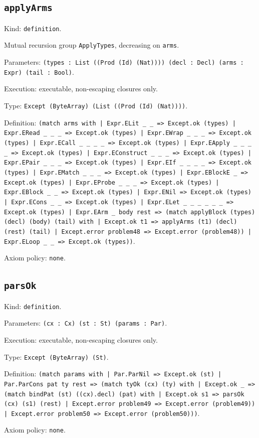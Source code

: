 \documentclass[11pt]{article}
\begin{document}
\subsection*{\texttt{applyArms}}
\noindent Kind: \texttt{definition}.\par
\noindent Mutual recursion group \texttt{ApplyTypes}, decreasing on \texttt{arms}.\par
\noindent Parameters: \texttt{(types : List ((Prod (Id) (Nat)))) (decl : Decl) (arms : Expr) (tail : Bool)}.\par
\noindent Execution: executable, non-escaping closures only.\par
\noindent Type: \texttt{Except (ByteArray) (List ((Prod (Id) (Nat))))}.\par
\noindent Definition: \texttt{(match arms with | Expr.ELit \_ \_ => Except.ok (types) | Expr.ERead \_ \_ \_ => Except.ok (types) | Expr.EWrap \_ \_ \_ => Except.ok (types) | Expr.ECall \_ \_ \_ \_ => Except.ok (types) | Expr.EApply \_ \_ \_ \_ => Except.ok (types) | Expr.EConstruct \_ \_ \_ => Except.ok (types) | Expr.EPair \_ \_ \_ => Except.ok (types) | Expr.EIf \_ \_ \_ \_ => Except.ok (types) | Expr.EMatch \_ \_ \_ => Except.ok (types) | Expr.EBlockE \_ => Except.ok (types) | Expr.EProbe \_ \_ \_ => Except.ok (types) | Expr.EBlock \_ \_ => Except.ok (types) | Expr.ENil => Except.ok (types) | Expr.ECons \_ \_ => Except.ok (types) | Expr.ELet \_ \_ \_ \_ \_ \_ => Except.ok (types) | Expr.EArm \_ body rest => (match applyBlock (types) (decl) (body) (tail) with | Except.ok t1 => applyArms (t1) (decl) (rest) (tail) | Except.error problem48 => Except.error (problem48)) | Expr.ELoop \_ \_ => Except.ok (types))}.\par
\noindent Axiom policy: \texttt{none}.\par
\subsection*{\texttt{parsOk}}
\noindent Kind: \texttt{definition}.\par
\noindent Parameters: \texttt{(cx : Cx) (st : St) (params : Par)}.\par
\noindent Execution: executable, non-escaping closures only.\par
\noindent Type: \texttt{Except (ByteArray) (St)}.\par
\noindent Definition: \texttt{(match params with | Par.ParNil => Except.ok (st) | Par.ParCons pat ty rest => (match tyOk (cx) (ty) with | Except.ok \_ => (match bindPat (st) ((cx).decl) (pat) with | Except.ok s1 => parsOk (cx) (s1) (rest) | Except.error problem49 => Except.error (problem49)) | Except.error problem50 => Except.error (problem50)))}.\par
\noindent Axiom policy: \texttt{none}.\par
\end{document}

